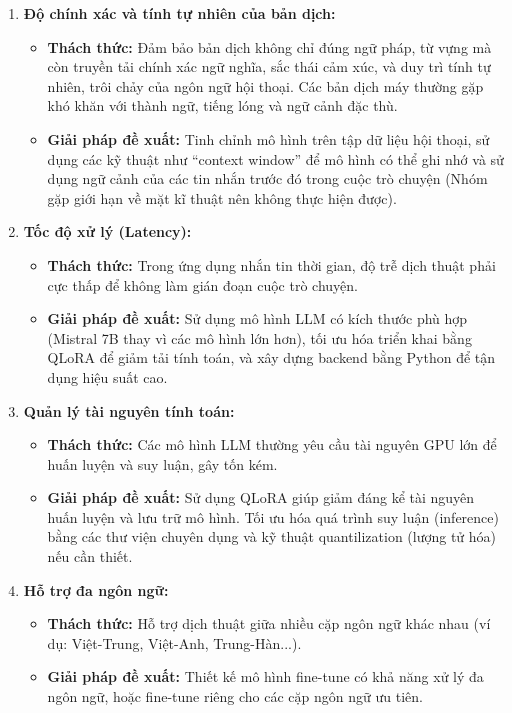 \begin{enumerate}
    \item \textbf{Độ chính xác và tính tự nhiên của bản dịch:}
    \begin{itemize}
        \item \textbf{Thách thức:} Đảm bảo bản dịch không chỉ đúng ngữ pháp, từ vựng mà còn truyền tải chính xác ngữ nghĩa, sắc thái cảm xúc, và duy trì tính tự nhiên, trôi chảy của ngôn ngữ hội thoại. Các bản dịch máy thường gặp khó khăn với thành ngữ, tiếng lóng và ngữ cảnh đặc thù.
        \item \textbf{Giải pháp đề xuất:} Tinh chỉnh mô hình trên tập dữ liệu hội thoại, sử dụng các kỹ thuật như ``context window'' để mô hình có thể ghi nhớ và sử dụng ngữ cảnh của các tin nhắn trước đó trong cuộc trò chuyện (Nhóm gặp giới hạn về mặt kĩ thuật nên không thực hiện được).
    \end{itemize}
    \item \textbf{Tốc độ xử lý (Latency):}
    \begin{itemize}
        \item \textbf{Thách thức:} Trong ứng dụng nhắn tin thời gian, độ trễ dịch thuật phải cực thấp để không làm gián đoạn cuộc trò chuyện.
        \item \textbf{Giải pháp đề xuất:} Sử dụng mô hình LLM có kích thước phù hợp (Mistral 7B thay vì các mô hình lớn hơn), tối ưu hóa triển khai bằng QLoRA để giảm tải tính toán, và xây dựng backend bằng Python để tận dụng hiệu suất cao.
    \end{itemize}
    \item \textbf{Quản lý tài nguyên tính toán:}
    \begin{itemize}
        \item \textbf{Thách thức:} Các mô hình LLM thường yêu cầu tài nguyên GPU lớn để huấn luyện và suy luận, gây tốn kém.
        \item \textbf{Giải pháp đề xuất:} Sử dụng QLoRA giúp giảm đáng kể tài nguyên huấn luyện và lưu trữ mô hình. Tối ưu hóa quá trình suy luận (inference) bằng các thư viện chuyên dụng và kỹ thuật quantilization (lượng tử hóa) nếu cần thiết.
    \end{itemize}
    \item \textbf{Hỗ trợ đa ngôn ngữ:}
    \begin{itemize}
        \item \textbf{Thách thức:} Hỗ trợ dịch thuật giữa nhiều cặp ngôn ngữ khác nhau (ví dụ: Việt-Trung, Việt-Anh, Trung-Hàn...).
        \item \textbf{Giải pháp đề xuất:} Thiết kế mô hình fine-tune có khả năng xử lý đa ngôn ngữ, hoặc fine-tune riêng cho các cặp ngôn ngữ ưu tiên.
    \end{itemize}
\end{enumerate}
